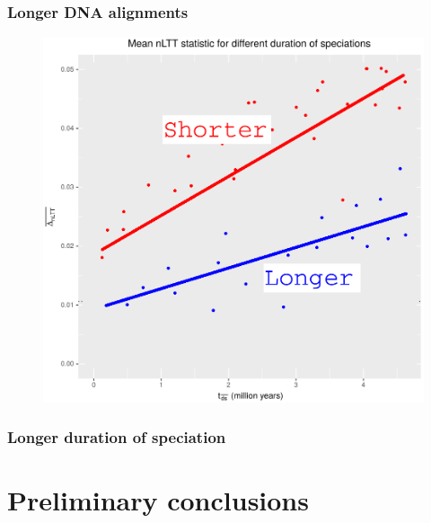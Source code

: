 \documentclass{beamer}
\begin{document}
\begin{frame}
  \frametitle{Longer DNA alignments}

  \begin{figure}[]
    \includegraphics[height=0.8\textheight]{expected_error_mean_durspec_alignment_length.png}
  \end{figure}

\end{frame}

\begin{frame}
  \frametitle{Longer duration of speciation}

  \begin{figure}[]
    
  \end{figure}

\end{frame}

\section[Preliminary conclusions]{Preliminary conclusions}
\end{document}
